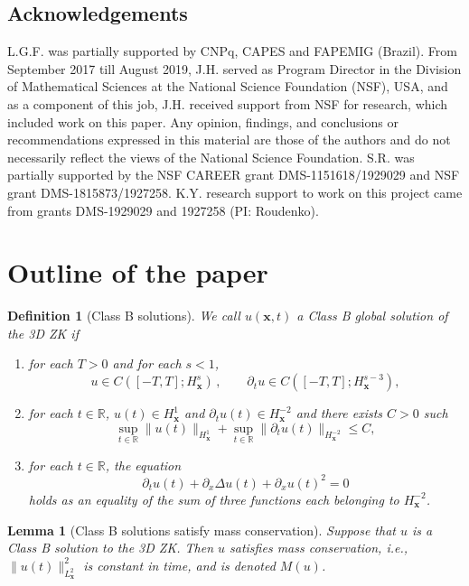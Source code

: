 \documentclass[12pt,letterpaper]{amsart}
\newtheorem{definition}[theorem]{Definition}
\newtheorem{lemma}[theorem]{Lemma}
\theoremstyle{remark}
\numberwithin{equation}{section}
\numberwithin{theorem}{section}
\numberwithin{table}{section}
\begin{document}
\subsection{Acknowledgements}
L.G.F. was partially supported by CNPq, CAPES and  FAPEMIG (Brazil). From September 2017 till August 2019, J.H. served as Program Director in the Division of Mathematical Sciences at the National Science Foundation (NSF), USA, and as a component of this job, J.H. received support from NSF for research, which included work on this paper.  Any opinion, findings, and conclusions or recommendations expressed in this material are those of the authors and do not necessarily reflect the views of the National Science Foundation.  S.R. was partially supported by the NSF CAREER grant DMS-1151618/1929029 and NSF grant DMS-1815873/1927258.  K.Y. research support to work on this project came from grants DMS-1929029 and 1927258 (PI: Roudenko).


\section{Outline of the paper}
\label{S:outline}

\begin{definition}[Class B solutions]
\label{D:ClassB}
We call $u(\mathbf{x},t)$ a \emph{Class B} global solution of the 3D ZK if 
\begin{enumerate}
\item 
for each $T>0$ and for each $s<1$, 
$$
u\in C([-T,T]; H_{\mathbf{x}}^s) \,, \qquad \partial_t u \in  C([-T,T]; H_{\mathbf{x}}^{s-3}),
$$
\item  
for each $t\in \mathbb{R}$, $u(t) \in H_{\mathbf{x}}^1$ and $\partial_t u(t) \in H_{\mathbf{x}}^{-2}$ and there exists $C>0$ such
$$
\sup_{t\in \mathbb{R}} \| u(t) \|_{H_{\mathbf{x}}^1} + \sup_{t\in\mathbb{R}} \| \partial_t u(t) \|_{H_{\mathbf{x}}^{-2}} \leq C,
$$
\item 
for each $t\in \mathbb{R}$, the equation
$$
\partial_t u(t) + \partial_x \Delta u(t) + \partial_x u(t)^2=0
$$
holds as an equality of the sum of three functions each belonging to $H^{-2}_{\mathbf{x}}$.
\end{enumerate}
\end{definition}

\begin{lemma}[Class B solutions satisfy mass conservation]
\label{L:mass-conservation}
Suppose that $u$ is a Class B solution to the 3D ZK.  Then $u$ satisfies mass conservation, i.e., $\| u(t) \|_{L_{\mathbf{x}}^2}^2$ is constant in time, and is denoted $M(u)$.  
\end{lemma}
\end{document}
